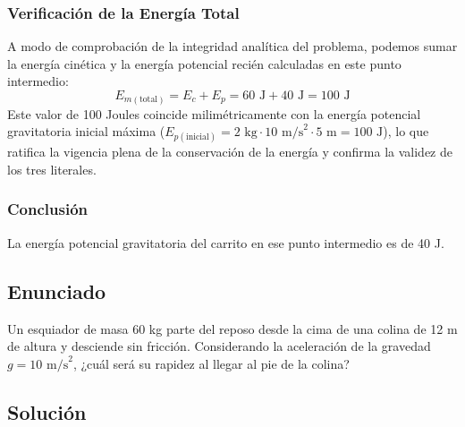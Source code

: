 \documentclass[12pt,a4paper]{article}
\begin{document}
\subsubsection*{Verificación de la Energía Total}
A modo de comprobación de la integridad analítica del problema, podemos sumar la energía cinética y la energía potencial recién calculadas en este punto intermedio:
$$E_{m(\text{total})} = E_c + E_p = 60 \text{ J} + 40 \text{ J} = 100 \text{ J}$$
Este valor de 100 Joules coincide milimétricamente con la energía potencial gravitatoria inicial máxima ($E_{p(\text{inicial})} = 2 \text{ kg} \cdot 10 \text{ m/s}^2 \cdot 5 \text{ m} = 100 \text{ J}$), lo que ratifica la vigencia plena de la conservación de la energía y confirma la validez de los tres literales.

\subsubsection*{Conclusión}
La energía potencial gravitatoria del carrito en ese punto intermedio es de 40 J.

\newpage
\subsection*{Enunciado}
Un esquiador de masa 60 kg parte del reposo desde la cima de una colina de 12 m de altura y desciende sin fricción. Considerando la aceleración de la gravedad $g = 10 \text{ m/s}^2$, ¿cuál será su rapidez al llegar al pie de la colina?

\begin{center}
\end{center}

\subsection*{Solución}
\end{document}
